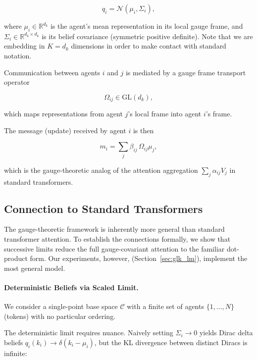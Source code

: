\documentclass[twoside,11pt]{article}
\begin{document}
\begin{equation}
q_i = \mathcal{N}(\mu_i, \Sigma_i),
\end{equation}

where $\mu_i \in \mathbb{R}^{d_k}$ is the agent's mean representation in its local gauge frame, and $\Sigma_i \in \mathbb{R}^{d_k\times d_k}$ is its belief covariance (symmetric positive definite). Note that we are embedding in $K=d_k$ dimensions in order to make contact with standard notation. 

Communication between agents $i$ and $j$ is mediated by a gauge frame transport operator

\begin{equation}
\Omega_{ij} \in \mathrm{GL}(d_k),
\end{equation}

which maps representations from agent $j$'s local frame into agent $i$'s frame. 

The message (update) received by agent $i$ is then

\begin{equation}
m_i = \sum_j \beta_{ij} \,\Omega_{ij}\mu_j,
\end{equation}

which is the gauge-theoretic analog of the attention aggregation $\sum_j \alpha_{ij} V_j$ in standard transformers.

\subsection{Connection to Standard Transformers}

The gauge-theoretic framework is inherently more general than standard transformer attention. To establish the connections formally, we show that successive limits reduce the full gauge-covariant attention to the familiar dot-product form. Our experiments, however, (Section~\ref{sec:glk_lm}), implement the most general model.

\paragraph{Deterministic Beliefs via Scaled Limit.}

We consider a single-point base space $\mathcal{C}$ with a finite set of agents $\{1,\dots,N\}$ (tokens) with no particular ordering. 

The deterministic limit requires nuance. Naively setting $\Sigma_i \to 0$ yields Dirac delta beliefs $q_i(k_i) \to \delta(k_i - \mu_i)$, but the KL divergence between distinct Diracs is infinite:
\end{document}
